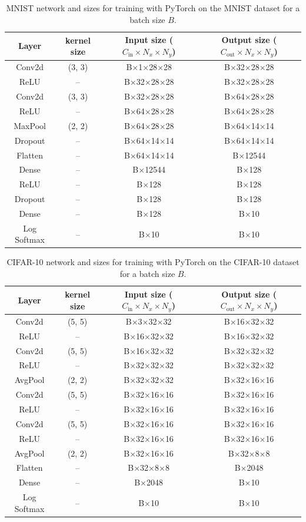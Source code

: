 \documentclass[10pt]{article}
\begin{document}
\begin{table}[t]
\caption{MNIST network and sizes for training with PyTorch on the
MNIST dataset for a batch size $B$.}\label{tab:MNIST-NW-py}
\centering
\begin{tabular}{cccc}
\toprule\addlinespace
Layer & kernel size & Input size ($C_{\text{in}} \times N_x \times N_y$) & Output
size ($C_{\text{out}} \times N_x \times N_y$)\tabularnewline
\midrule
Conv2d & (3, 3) & B$\times$1$\times$28$\times$28 & B$\times$32$\times$28$\times$28\tabularnewline
ReLU & -- & B$\times$32$\times$28$\times$28 & B$\times$32$\times$28$\times$28\tabularnewline
Conv2d & (3, 3) & B$\times$32$\times$28$\times$28 & B$\times$64$\times$28$\times$28\tabularnewline
ReLU & -- & B$\times$64$\times$28$\times$28 & B$\times$64$\times$28$\times$28\tabularnewline
MaxPool & (2, 2) & B$\times$64$\times$28$\times$28 & B$\times$64$\times$14$\times$14\tabularnewline
Dropout & -- & B$\times$64$\times$14$\times$14 & B$\times$64$\times$14$\times$14\tabularnewline
Flatten & -- & B$\times$64$\times$14$\times$14 & B$\times$12544\tabularnewline
Dense & -- & B$\times$12544 & B$\times$128\tabularnewline
ReLU & -- & B$\times$128 & B$\times$128\tabularnewline
Dropout & -- & B$\times$128 & B$\times$128\tabularnewline
Dense & -- & B$\times$128 & B$\times$10\tabularnewline
Log Softmax & -- & B$\times$10 & B$\times$10\tabularnewline
\bottomrule
\end{tabular}
\end{table}

\begin{table}[t]
\caption{CIFAR-10 network and sizes for training with PyTorch on the
CIFAR-10 dataset for a batch size $B$.}\label{tab:CIFAR-NW}
\centering
\begin{tabular}{cccc}
\toprule\addlinespace
Layer & kernel size & Input size ($C_{\text{in}} \times N_x \times N_y$) & Output
size ($C_{\text{out}} \times N_x \times N_y$)\tabularnewline
\midrule
Conv2d & (5, 5) & B$\times$3$\times$32$\times$32 & B$\times$16$\times$32$\times$32\tabularnewline
ReLU & -- & B$\times$16$\times$32$\times$32 & B$\times$16$\times$32$\times$32\tabularnewline
Conv2d & (5, 5) & B$\times$16$\times$32$\times$32 & B$\times$32$\times$32$\times$32\tabularnewline
ReLU & -- & B$\times$32$\times$32$\times$32 & B$\times$32$\times$32$\times$32\tabularnewline
AvgPool & (2, 2) & B$\times$32$\times$32$\times$32 & B$\times$32$\times$16$\times$16\tabularnewline
Conv2d & (5, 5) & B$\times$32$\times$16$\times$16 & B$\times$32$\times$16$\times$16\tabularnewline
ReLU & -- & B$\times$32$\times$16$\times$16 & B$\times$32$\times$16$\times$16\tabularnewline
Conv2d & (5, 5) & B$\times$32$\times$16$\times$16 & B$\times$32$\times$16$\times$16\tabularnewline
ReLU & -- & B$\times$32$\times$16$\times$16 & B$\times$32$\times$16$\times$16\tabularnewline
AvgPool & (2, 2) & B$\times$32$\times$16$\times$16 & B$\times$32$\times$8$\times$8\tabularnewline
Flatten & -- & B$\times$32$\times$8$\times$8 & B$\times$2048\tabularnewline
Dense & -- & B$\times$2048 & B$\times$10\tabularnewline
Log Softmax & -- & B$\times$10 & B$\times$10\tabularnewline
\bottomrule
\end{tabular}
\end{table}
\end{document}
